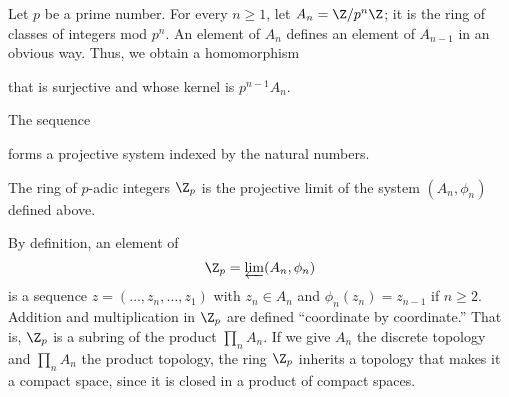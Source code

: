 \documentclass [preview, border = 20pt] {standalone}
\begin{document}
\pagecolor{black}
\color{white}
Let $p$ be a prime number. For every $n\ge 1$, let $A_n = \Z/p^n\Z$; it is the ring of classes of integers mod $p^n$. An element of $A_n$ defines an element of $A_{n-1}$ in an obvious way. Thus, we obtain a homomorphism
\begin{center}
\end{center} 
that is surjective and whose kernel is $p^{n-1}A_n$.

The sequence
\begin{center}
\end{center} 
forms a projective system indexed by the natural numbers.

The ring of $p$-adic integers $\Z_p$ is the projective limit of the system $(A_n,\phi_n)$ defined above.

By definition, an element of 
\[
\Z_p = \varprojlim (A_n,\phi_n)
\]
is a sequence $z = (\hdots, z_n,\hdots, z_1)$ with $z_n\in A_n$ and $\phi_n(z_n) = z_{n-1}$ if $n\ge 2$. Addition and multiplication in $\Z_p$ are defined ``coordinate by coordinate.'' That is, $\Z_p$ is a subring of the product $\prod_n A_n$. If we give $A_n$ the discrete topology and $\prod_n A_n$ the product topology, the ring $\Z_p$ inherits a topology that makes it a compact space, since it is closed in a product of compact spaces.
\end{document}
